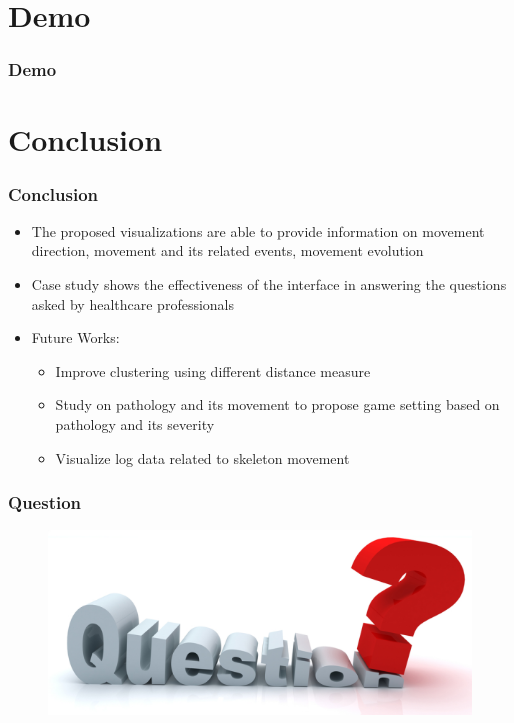 \documentclass[xcolor=table]{beamer}
\begin{document}
\section{Demo}
\begin{frame}
\frametitle{Demo}
\end{frame}

\section{Conclusion}
\begin{frame}
\frametitle{Conclusion}
\begin{itemize}
\item The proposed visualizations are able to provide information on movement direction, movement and its related events, movement evolution
\item Case study shows the effectiveness of the interface in answering the questions asked by healthcare professionals
\item Future Works:
\begin{itemize}
\item Improve clustering using different distance measure
\item Study on pathology and its movement to propose game setting based on pathology and its severity
\item Visualize log data related to skeleton movement
\end{itemize}
\end{itemize}
\end{frame}

\begin{frame}
\frametitle{Question}
\begin{figure}
\includegraphics[scale=1.3]{images/question.png}
\end{figure}
\end{frame}
\end{document}
